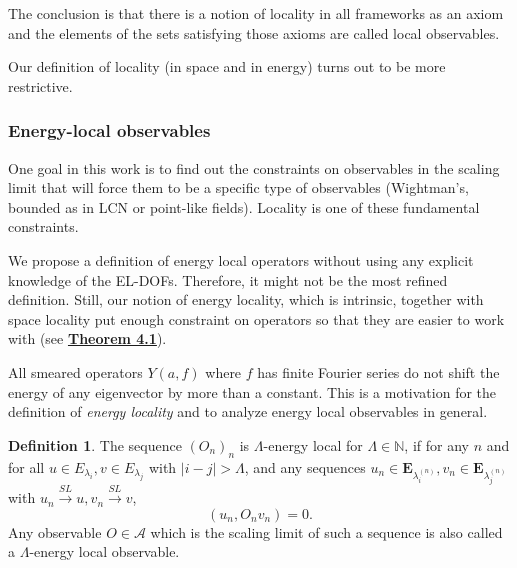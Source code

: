 \documentclass[twoside,11pt,titlepage]{amsart}
\renewcommand{\=}[1]{\stackrel{#1}{=}} %
\theoremstyle{definition}
\newtheorem{dfn}{Definition}
\theoremstyle{remark}
\begin{document}
The conclusion is that there is a notion of locality in all frameworks as an axiom and the elements of the sets satisfying those axioms are called local observables.

Our definition of locality (in space and in energy) turns out to be more restrictive.

\subsubsection{Energy-local observables}

\hfill \break 
One goal in this work is to find out the constraints on observables in the scaling limit that will force them to be a specific type of observables (Wightman's, bounded as in LCN or point-like fields). Locality is one of these fundamental constraints.

We propose a definition of energy local operators without using any explicit knowledge of the EL-DOFs. Therefore, it might not be the most refined definition. Still, our notion of energy locality, which is intrinsic, together with space locality put enough constraint on operators so that they are easier to work with (see \hyperref[thm4.1]{\textbf{Theorem 4.1}}).

All smeared operators $Y(a,f)$ where $f$ has finite Fourier series do not shift the energy of any eigenvector by more than a constant. This is a motivation for the definition of \textit{energy locality} and to analyze energy local observables in general.

\begin{dfn}\label{dfn10}
The sequence $(O_n)_n$ is $\Lambda$-energy local for $\Lambda \in \mathbb{N}$, if for any $n$ and for all $u\in E_{\lambda_i},v \in E_{\lambda_j}$ with $|i-j|>\Lambda$, and any sequences $u_n \in \textbf{E}_{\lambda_i^{(n)}},v_n \in \textbf{E}_{\lambda_j^{(n)}}$ with $u_n \xrightarrow{SL} u, v_n \xrightarrow{SL} v$,
$$(u_n,O_nv_n)=0.$$
Any observable $O \in \mathcal{A}$ which is the scaling limit of such a sequence is also called a $\Lambda$-energy local observable.
\end{dfn}
\end{document}
